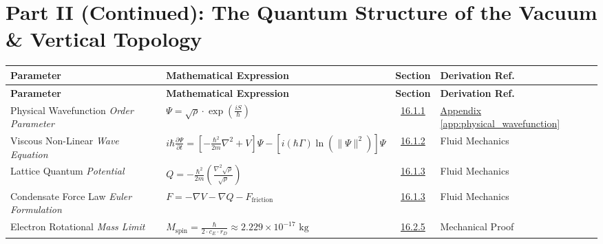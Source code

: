 \vspace{1cm}

\section*{Part II (Continued): The Quantum Structure of the Vacuum \& Vertical Topology}

\vspace{0.5cm}
\noindent
\renewcommand{\arraystretch}{1.6}
\begin{longtable}{@{} p{4.5cm} p{6cm} c p{4cm} @{}}
\toprule
\textbf{Parameter} & \textbf{Mathematical Expression} & \textbf{Section} & \textbf{Derivation Ref.} \\
\midrule
\endfirsthead

\toprule
\textbf{Parameter} & \textbf{Mathematical Expression} & \textbf{Section} & \textbf{Derivation Ref.} \\
\midrule
\endhead

Physical Wavefunction \newline \textit{Order Parameter} & $\Psi = \sqrt{\rho} \cdot \exp\left(\frac{i S}{\hbar}\right)$ & \hyperref[sec:16.1.1]{16.1.1} & \hyperref[app:physical_wavefunction]{Appendix \ref*{app:physical_wavefunction}} \\

Viscous Non-Linear \newline \textit{Wave Equation} & $i\hbar \frac{\partial\Psi}{\partial t} = \left[-\frac{\hbar^2}{2m} \nabla^2 + V\right]\Psi - \left[i(\hbar\Gamma)\ln(\|\Psi\|^2)\right]\Psi$ & \hyperref[sec:16.1.2]{16.1.2} & Fluid Mechanics \\

Lattice Quantum \newline \textit{Potential} & $Q = -\frac{\hbar^2}{2m} \left(\frac{\nabla^2 \sqrt{\rho}}{\sqrt{\rho}}\right)$ & \hyperref[sec:16.1.3]{16.1.3} & Fluid Mechanics \\

Condensate Force Law \newline \textit{Euler Formulation} & $F = -\nabla V - \nabla Q - F_{\text{friction}}$ & \hyperref[sec:16.1.3]{16.1.3} & Fluid Mechanics \\

Electron Rotational \newline \textit{Mass Limit} & $M_{\text{spin}} = \frac{\hbar}{2 \cdot c_E \cdot r_D} \approx 2.229 \times 10^{-17} \text{ kg}$ & \hyperref[sec:16.2.5]{16.2.5} & Mechanical Proof \\


\end{longtable}
